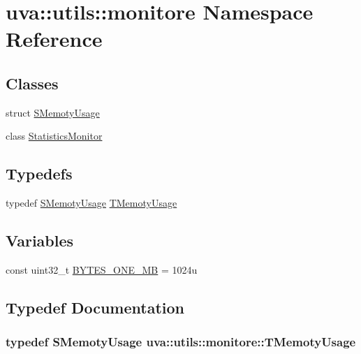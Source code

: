 \hypertarget{namespaceuva_1_1utils_1_1monitore}{}\section{uva\+:\+:utils\+:\+:monitore Namespace Reference}
\label{namespaceuva_1_1utils_1_1monitore}
\subsection*{Classes}
\begin{DoxyCompactItemize}
\item 
struct \hyperlink{structuva_1_1utils_1_1monitore_1_1_s_memoty_usage}{S\+Memoty\+Usage}
\item 
class \hyperlink{classuva_1_1utils_1_1monitore_1_1_statistics_monitor}{Statistics\+Monitor}
\end{DoxyCompactItemize}
\subsection*{Typedefs}
\begin{DoxyCompactItemize}
\item 
typedef \hyperlink{structuva_1_1utils_1_1monitore_1_1_s_memoty_usage}{S\+Memoty\+Usage} \hyperlink{namespaceuva_1_1utils_1_1monitore_ac0df0397adabb51dc8e620649541e891}{T\+Memoty\+Usage}
\end{DoxyCompactItemize}
\subsection*{Variables}
\begin{DoxyCompactItemize}
\item 
const uint32\+\_\+t \hyperlink{namespaceuva_1_1utils_1_1monitore_a286c7985e00d8d56cb91210a3e801e54}{B\+Y\+T\+E\+S\+\_\+\+O\+N\+E\+\_\+\+M\+B} = 1024u
\end{DoxyCompactItemize}


\subsection{Typedef Documentation}
\hypertarget{namespaceuva_1_1utils_1_1monitore_ac0df0397adabb51dc8e620649541e891}{}
\subsubsection[{T\+Memoty\+Usage}]{\setlength{\rightskip}{0pt plus 5cm}typedef {\bf S\+Memoty\+Usage} {\bf uva\+::utils\+::monitore\+::\+T\+Memoty\+Usage}}\label{namespaceuva_1_1utils_1_1monitore_ac0df0397adabb51dc8e620649541e891}


